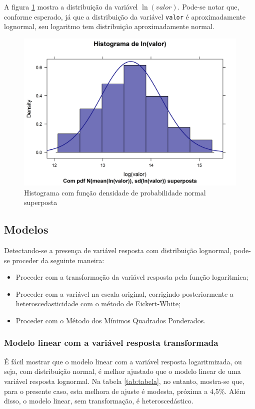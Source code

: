 \documentclass[a4paper]{article}
\providecommand{\tightlist}{%
  \setlength{\itemsep}{0pt}\setlength{\parskip}{0pt}}
\begin{document}
A figura \ref{fig:hist_densidade2} mostra a distribuição da variável
\(\ln(valor)\). Pode-se notar que, conforme esperado, já que a
distribuição da variável \texttt{valor} é aproximadamente lognormal, seu
logaritmo tem distribuição aproximadamente normal.

\begin{figure}[H]

{\centering \includegraphics[width=0.5\linewidth]{images/hist_densidade2-1} 

}

\caption{Histograma com função densidade de probabilidade normal superposta}\label{fig:hist_densidade2}
\end{figure}

\subsection{Modelos}\label{modelos}

Detectando-se a presença de variável resposta com distribuição
lognormal, pode-se proceder da seguinte maneira:

\begin{itemize}
\tightlist
\item
  Proceder com a transformação da variável resposta pela função
  logarítmica;
\item
  Proceder com a variável na escala original, corrigindo posteriormente
  a heteroscedasticidade com o método de Eickert-White;
\item
  Proceder com o Método dos Mínimos Quadrados Ponderados.
\end{itemize}

\subsubsection{Modelo linear com a variável resposta
transformada}\label{modelo-linear-com-a-variavel-resposta-transformada}

É fácil mostrar que o modelo linear com a variável resposta
logaritmizada, ou seja, com distribuição normal, é melhor ajustado que o
modelo linear de uma variável resposta lognormal. Na tabela
\ref{tab:tabela}, no entanto, mostra-se que, para o presente caso, esta
melhora de ajuste é modesta, próxima a 4,5\%. Além disso, o modelo
linear, sem transformação, é heteroscedástico.
\end{document}
